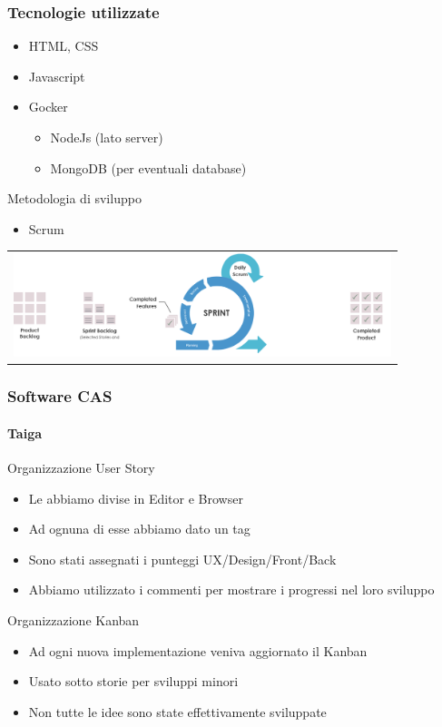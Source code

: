 \documentclass{beamer}
\begin{document}
\begin{frame}
\frametitle{Tecnologie utilizzate}
\begin{itemize}
  \item HTML, CSS
  \item Javascript
  \item Gocker
  \begin{itemize}
  \item NodeJs (lato server)
  \item MongoDB (per eventuali database)
\end{itemize}
\end{itemize}
Metodologia di sviluppo
  \begin{itemize}
  \item Scrum
\end{itemize}
      \centering  \begin{tabular}{c}
        \includegraphics[width=11cm]{Images/scrum/scrum-sprint}
      \end{tabular}
\end{frame}

\begin{frame}
\frametitle{Software CAS}
\framesubtitle{Taiga}
Organizzazione User Story
  \begin{itemize}
  	\item Le abbiamo divise in Editor e Browser
	\item Ad ognuna di esse abbiamo dato un tag
	\item Sono stati assegnati i punteggi UX/Design/Front/Back
	\item Abbiamo utilizzato i commenti per mostrare i progressi nel loro sviluppo
  \end{itemize}
  Organizzazione Kanban
    \begin{itemize}
  	\item Ad ogni nuova implementazione veniva aggiornato il Kanban
	\item Usato sotto storie per sviluppi minori
	\item Non tutte le idee sono state effettivamente sviluppate
  \end{itemize}
\end{frame}
\end{document}
